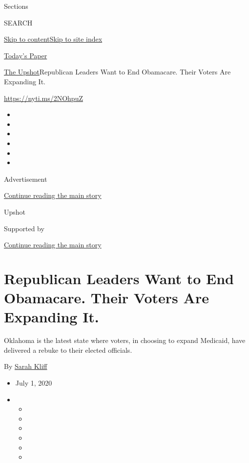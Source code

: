 Sections

SEARCH

\protect\hyperlink{site-content}{Skip to
content}\protect\hyperlink{site-index}{Skip to site index}

\href{https://myaccount.nytimes3xbfgragh.onion/auth/login?response_type=cookie\&client_id=vi}{}

\href{https://www.nytimes3xbfgragh.onion/section/todayspaper}{Today's
Paper}

\href{/section/upshot}{The Upshot}\textbar{}Republican Leaders Want to
End Obamacare. Their Voters Are Expanding It.

\url{https://nyti.ms/2NOhpuZ}

\begin{itemize}
\item
\item
\item
\item
\item
\item
\end{itemize}

Advertisement

\protect\hyperlink{after-top}{Continue reading the main story}

Upshot

Supported by

\protect\hyperlink{after-sponsor}{Continue reading the main story}

\hypertarget{republican-leaders-want-to-end-obamacare-their-voters-are-expanding-it}{%
\section{Republican Leaders Want to End Obamacare. Their Voters Are
Expanding
It.}\label{republican-leaders-want-to-end-obamacare-their-voters-are-expanding-it}}

Oklahoma is the latest state where voters, in choosing to expand
Medicaid, have delivered a rebuke to their elected officials.

By \href{https://www.nytimes3xbfgragh.onion/by/sarah-kliff}{Sarah Kliff}

\begin{itemize}
\item
  July 1, 2020
\item
  \begin{itemize}
  \item
  \item
  \item
  \item
  \item
  \item
  \end{itemize}
\end{itemize}

